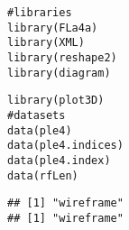 \documentclass[a4paper,english,10pt]{article}\usepackage[]{graphicx}\usepackage[]{color}
\makeatletter
\newcommand{\hlcom}[1]{\textcolor[rgb]{0.2,0.267,0.4}{#1}}%
\newcommand{\hlstd}[1]{\textcolor[rgb]{0,0,0}{#1}}%
\newcommand{\hlkwd}[1]{\textcolor[rgb]{0.361,0.506,0.596}{#1}}%
\newenvironment{kframe}{%
 \def\at@end@of@kframe{}%
 \ifinner\ifhmode%
  \def\at@end@of@kframe{\end{minipage}}%
  \begin{minipage}{\columnwidth}%
 \fi\fi%
 \def\FrameCommand##1{\hskip\@totalleftmargin \hskip-\fboxsep
 \colorbox{shadecolor}{##1}\hskip-\fboxsep
     \hskip-\linewidth \hskip-\@totalleftmargin \hskip\columnwidth}%
 \MakeFramed {\advance\hsize-\width
   \@totalleftmargin\z@ \linewidth\hsize
   \@setminipage}}%
 {\par\unskip\endMakeFramed%
 \at@end@of@kframe}
\newenvironment{knitrout}{}{} %
\makeatother
\begin{document}
\begin{knitrout}
\color{fgcolor}\begin{kframe}
\begin{alltt}
\hlcom{# libraries}
\hlkwd{library}\hlstd{(FLa4a)}
\hlkwd{library}\hlstd{(XML)}
\hlkwd{library}\hlstd{(reshape2)}
\hlkwd{library}\hlstd{(diagram)}
\end{alltt}


{\ttfamily\noindent\bfseries\color{errorcolor}{\#\# Error in library(diagram): there is no package called 'diagram'}}\begin{alltt}
\hlkwd{library}\hlstd{(plot3D)}
\hlcom{# datasets}
\hlkwd{data}\hlstd{(ple4)}
\hlkwd{data}\hlstd{(ple4.indices)}
\hlkwd{data}\hlstd{(ple4.index)}
\hlkwd{data}\hlstd{(rfLen)}
\end{alltt}
\end{kframe}
\end{knitrout}

\begin{knitrout}
\color{fgcolor}\begin{kframe}
\begin{verbatim}
## [1] "wireframe"
## [1] "wireframe"
\end{verbatim}
\end{kframe}
\end{knitrout}
\end{document}
